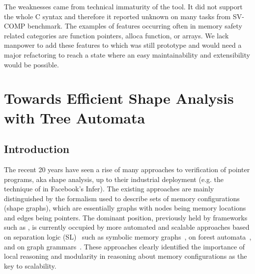 {The weaknesses came from technical immaturity of the tool.
It did not support the whole C syntax and therefore it reported
unknown on many tasks from SV-COMP benchmark.
The examples of features occurring often in memory safety related categories are function  
pointers, alloca function, or arrays.
We lack manpower to add these features to \forester which was still prototype and
would need a major refactoring to reach a state where an easy maintainability and extensibility would be possible.

\chapter{Towards Efficient Shape Analysis with Tree Automata}
\label{ch:netys}
\section{Introduction}

%
%
The recent 20 years have seen a rise of many approaches to verification of pointer programs, aka shape analysis, up to their industrial deployment (e.g. the technique of \cite{abduction11} in Facebook's Infer). 
%
The existing approaches are mainly distinguished by the formalism used to describe sets of memory configurations (shape graphs), which are essentially graphs with nodes being memory locations and edges being pointers.
%
The dominant position, previously held by frameworks such as \cite{pale,pale01},
is currently occupied by more automated and scalable approaches based on separation
logic (SL)~\cite{Reynolds:SepLogic:02,InvaderCAV07,sas07:chang_rival_necula} such as symbolic memory
graphs~\cite{dudka13sas}, on forest automata~\cite{forester12}, and on graph
grammars~\cite{Juggrnaut2015}.
These approaches clearly identified the importance of local reasoning and modularity in reasoning about memory configurations as the key to scalability.

}

